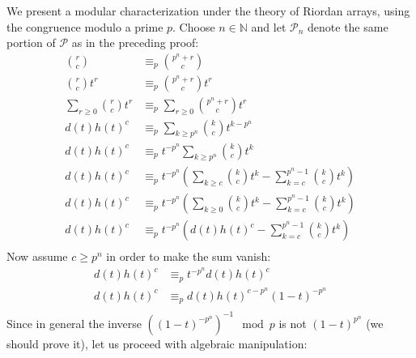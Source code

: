 \documentclass[11pt,a4paper]{article} %
\begin{document}
    We present a modular characterization under the theory of Riordan arrays, using the
    congruence modulo a prime $p$. Choose $n\in\mathbb{N}$ and let $\mathcal{P}_n$ denote the
    same portion of $\mathcal{P}$ as in the preceding proof:
      \begin{displaymath}
          \begin{split}
                {{r} \choose {c}} &\equiv_p {{p^n+r} \choose {c}} \\
                {{r} \choose {c}}t^r &\equiv_p {{p^n+r} \choose {c}}t^r \\
                \sum_{r\geq 0}{{{r} \choose {c}}t^r} &\equiv_p \sum_{r\geq 0}{{{p^n+r} \choose {c}}t^r} \\
                d(t)h(t)^{c} &\equiv_p \sum_{k\geq p^n}{{{k} \choose {c}}t^{k-p^n}} \\
                d(t)h(t)^{c} &\equiv_p t^{-p^n}\sum_{k\geq p^n}{{{k} \choose {c}}t^{k}} \\
                d(t)h(t)^{c} &\equiv_p t^{-p^n}\left(
                    \sum_{k\geq c}{{{k} \choose {c}}t^{k}}-\sum_{k=c}^{p^n -1}{{{k} \choose {c}}t^{k}}\right) \\
                d(t)h(t)^{c} &\equiv_p t^{-p^n}\left(
                    \sum_{k\geq 0}{{{k} \choose {c}}t^{k}}-\sum_{k=c}^{p^n -1}{{{k} \choose {c}}t^{k}}\right) \\
                d(t)h(t)^{c} &\equiv_p t^{-p^n}\left(d(t)h(t)^{c} -\sum_{k=c}^{p^n -1}{{{k} \choose {c}}t^{k}}\right) \\
          \end{split}
      \end{displaymath}
    Now assume $c \geq p^n$ in order to make the sum vanish:
      \begin{displaymath}
          \begin{split}
                d(t)h(t)^{c} &\equiv_p t^{-p^n} d(t)h(t)^{c} \\
                d(t)h(t)^{c} &\equiv_p d(t)h(t)^{c-p^n} (1-t)^{-p^n} \\
          \end{split}
      \end{displaymath}
    Since in general the inverse $\left((1-t)^{-p^n}\right)^{-1}\mod p$ is not $(1-t)^{p^n}$
    (we should prove it), let us proceed with algebraic manipulation:
\end{document}
